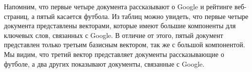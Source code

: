 Напомним, что первые четыре документа рассказывают о Google и рейтинге веб-страниц, а пятый касается футбола. Из таблиц можно увидеть, что первые четыре документа представлены векторами, которые имеют большие компоненты для ключевых слов, связанных с Google. В отличие от этого, пятый документ представлен только третьим базисным вектором, так же с большой компонентой. Мы видим, что третий вектор представляет документы рассказывающие о футболе, а два других показывают документы, связанные с Google.
